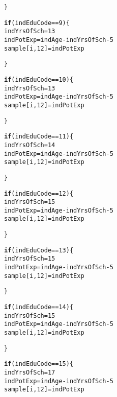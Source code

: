 \documentclass{article}\usepackage[]{graphicx}\usepackage[]{color}
\makeatletter
\newcommand{\hlnum}[1]{\textcolor[rgb]{0.686,0.059,0.569}{#1}}%
\newcommand{\hlopt}[1]{\textcolor[rgb]{0,0,0}{#1}}%
\newcommand{\hlstd}[1]{\textcolor[rgb]{0.345,0.345,0.345}{#1}}%
\newcommand{\hlkwa}[1]{\textcolor[rgb]{0.161,0.373,0.58}{\textbf{#1}}}%
\newcommand{\hlkwb}[1]{\textcolor[rgb]{0.69,0.353,0.396}{#1}}%
\newenvironment{kframe}{%
 \def\at@end@of@kframe{}%
 \ifinner\ifhmode%
  \def\at@end@of@kframe{\end{minipage}}%
  \begin{minipage}{\columnwidth}%
 \fi\fi%
 \def\FrameCommand##1{\hskip\@totalleftmargin \hskip-\fboxsep
 \colorbox{shadecolor}{##1}\hskip-\fboxsep
     \hskip-\linewidth \hskip-\@totalleftmargin \hskip\columnwidth}%
 \MakeFramed {\advance\hsize-\width
   \@totalleftmargin\z@ \linewidth\hsize
   \@setminipage}}%
 {\par\unskip\endMakeFramed%
 \at@end@of@kframe}
\newenvironment{knitrout}{}{} %
\makeatother
\begin{document}
\begin{knitrout}
\begin{kframe}
\begin{alltt}
    \hlstd{\}}

    \hlkwa{if} \hlstd{(indEduCode} \hlopt{==} \hlnum{9}\hlstd{)\{}
      \hlstd{indYrsOfSch} \hlkwb{=} \hlnum{13}
      \hlstd{indPotExp} \hlkwb{=} \hlstd{indAge} \hlopt{-} \hlstd{indYrsOfSch} \hlopt{-} \hlnum{5}
      \hlstd{sample[i,}\hlnum{12}\hlstd{]} \hlkwb{=} \hlstd{indPotExp}

    \hlstd{\}}

    \hlkwa{if} \hlstd{(indEduCode} \hlopt{==} \hlnum{10}\hlstd{)\{}
      \hlstd{indYrsOfSch} \hlkwb{=} \hlnum{13}
      \hlstd{indPotExp} \hlkwb{=} \hlstd{indAge} \hlopt{-} \hlstd{indYrsOfSch} \hlopt{-} \hlnum{5}
      \hlstd{sample[i,}\hlnum{12}\hlstd{]} \hlkwb{=} \hlstd{indPotExp}

    \hlstd{\}}

    \hlkwa{if} \hlstd{(indEduCode} \hlopt{==} \hlnum{11}\hlstd{)\{}
      \hlstd{indYrsOfSch} \hlkwb{=} \hlnum{14}
      \hlstd{indPotExp} \hlkwb{=} \hlstd{indAge} \hlopt{-} \hlstd{indYrsOfSch} \hlopt{-} \hlnum{5}
      \hlstd{sample[i,}\hlnum{12}\hlstd{]} \hlkwb{=} \hlstd{indPotExp}

    \hlstd{\}}

    \hlkwa{if} \hlstd{(indEduCode} \hlopt{==} \hlnum{12}\hlstd{)\{}
      \hlstd{indYrsOfSch} \hlkwb{=} \hlnum{15}
      \hlstd{indPotExp} \hlkwb{=} \hlstd{indAge} \hlopt{-} \hlstd{indYrsOfSch} \hlopt{-} \hlnum{5}
      \hlstd{sample[i,}\hlnum{12}\hlstd{]} \hlkwb{=} \hlstd{indPotExp}

    \hlstd{\}}

    \hlkwa{if} \hlstd{(indEduCode} \hlopt{==} \hlnum{13}\hlstd{)\{}
      \hlstd{indYrsOfSch} \hlkwb{=} \hlnum{15}
      \hlstd{indPotExp} \hlkwb{=} \hlstd{indAge} \hlopt{-} \hlstd{indYrsOfSch} \hlopt{-} \hlnum{5}
      \hlstd{sample[i,}\hlnum{12}\hlstd{]} \hlkwb{=} \hlstd{indPotExp}

    \hlstd{\}}

    \hlkwa{if} \hlstd{(indEduCode} \hlopt{==} \hlnum{14}\hlstd{)\{}
      \hlstd{indYrsOfSch} \hlkwb{=} \hlnum{15}
      \hlstd{indPotExp} \hlkwb{=} \hlstd{indAge} \hlopt{-} \hlstd{indYrsOfSch} \hlopt{-} \hlnum{5}
      \hlstd{sample[i,}\hlnum{12}\hlstd{]} \hlkwb{=} \hlstd{indPotExp}

    \hlstd{\}}

    \hlkwa{if} \hlstd{(indEduCode} \hlopt{==} \hlnum{15}\hlstd{)\{}
      \hlstd{indYrsOfSch} \hlkwb{=} \hlnum{17}
      \hlstd{indPotExp} \hlkwb{=} \hlstd{indAge} \hlopt{-} \hlstd{indYrsOfSch} \hlopt{-} \hlnum{5}
      \hlstd{sample[i,}\hlnum{12}\hlstd{]} \hlkwb{=} \hlstd{indPotExp}


\end{alltt}
\end{kframe}
\end{knitrout}
\end{document}
